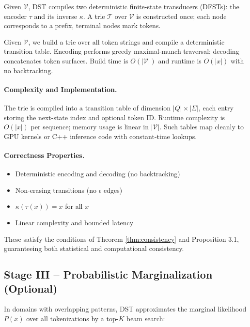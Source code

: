 Given $\mathcal{V}$, DST compiles two deterministic finite-state
transducers (DFSTs): the encoder $\tau$ and its inverse $\kappa$.
A trie $\mathcal{T}$ over $\mathcal{V}$ is constructed once;
each node corresponds to a prefix, terminal nodes mark tokens.

Given $\mathcal{V}$, we build a trie over all token strings and compile a deterministic transition table. Encoding performs greedy maximal‑munch traversal; decoding concatenates token surfaces. Build time is $O(|\mathcal{V}|)$ and runtime is $O(|x|)$ with no backtracking.

\paragraph{Complexity and Implementation.}
The trie is compiled into a transition table
of dimension $|Q|\!\times\!|\Sigma|$,
each entry storing the next-state index and optional token ID.
Runtime complexity is $O(|x|)$ per sequence;
memory usage is linear in $|\mathcal{V}|$.
Such tables map cleanly to GPU kernels or C++ inference code
with constant-time lookups.

\paragraph{Correctness Properties.}
\begin{itemize}
  \item Deterministic encoding and decoding (no backtracking)
  \item Non-erasing transitions (no $\epsilon$ edges)
  \item $\kappa(\tau(x))\!=\!x$ for all $x$
  \item Linear complexity and bounded latency
\end{itemize}

These satisfy the conditions of Theorem \ref{thm:consistency}
and Proposition 3.1, guaranteeing both
statistical and computational consistency.

\subsection{Stage III – Probabilistic Marginalization (Optional)}
\label{sec:method-kbest}

In domains with overlapping patterns,
DST approximates the marginal likelihood $P(x)$
over all tokenizations by a top-$K$ beam search:

